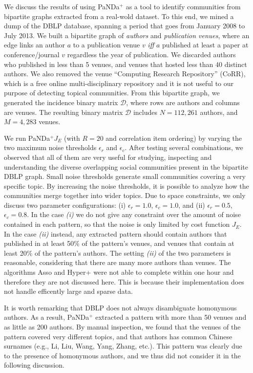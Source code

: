 \documentclass{article}
\newcommand{\db}      {\ensuremath{\mathcal{D}}\xspace}  %
\newcommand{\myalgostyle}[1]  {{\sc #1}\xspace}
\newcommand{\pandaplus}        {\myalgostyle{PaNDa$^+$}}
\newcommand{\hyperplus}    {\myalgostyle{Hyper+}}
\newcommand{\asso}           {\myalgostyle{Asso}}
\newcommand{\hide}[1]{}
\begin{document}
We discuss the results of using \pandaplus as a tool to identify communities from bipartite graphs extracted from a real-wold dataset.
To this end, we mined a dump of the DBLP database, 
spanning a period that goes from January 2008 to July 2013. 
We built a bipartite graph of \emph{authors} and \emph{publication venues}, where 
an edge links an author $a$ to a publication venue $v$ \emph{iff} $a$ published at 
least a paper at conference/journal $v$ regardless the year of publication.
We discarded authors who published in less than 5 venues, and 
venues that hosted less than 40 distinct authors. 
We also removed the venue ``Computing Research Repository'' (CoRR)\hide{\footnote{\url{http://arxiv.org/corr/home}}}, which is a free online multi-disciplinary repository
and it is not useful to our purpose of detecting topical communities.
From this bipartite graph, we generated the incidence binary matrix \db, where  rows are authors and columns are venues.
The resulting binary matrix $\db$ includes $N = 112,261$ authors, and $M = 4,283$ venues.

We run \pandaplus $J_E$ (with $R=20$ and correlation item ordering) by varying 
the two maximum noise thresholds $\epsilon_{r}$ and $\epsilon_{c}$.
After testing several combinations, we observed that all of them are very useful for studying, inspecting and understanding the
diverse overlapping social communities present in the bipartite DBLP graph. Small noise thresholds generate small communities covering a very specific topic.
By increasing the noise thresholds, it is possible to analyze how the communities merge together into wider topics.
Due to space constraints, we only discuss two parameter configurations: 
(i)  $\epsilon_{r}=1.0$, $\epsilon_{c}=1.0$,  and (ii)  $\epsilon_{r}=0.5$, $\epsilon_{c}=0.8$.
In the case \emph{(i)} we do not give any constraint over the amount of noise contained in each pattern, so that the noise is only limited by cost function $J_E$.
In the case \emph{(ii)} instead, any extracted pattern should contain authors that published in at least  50\% of the pattern's venues,
and venues that contain at least 20\% of the pattern's authors.
The setting \emph{(ii)} of the two parameters is reasonable, considering that  
there are many more authors than venues. 
The algorithms \asso and \hyperplus were not able to complete within one hour and therefore they are not discussed here.
This is because their implementation does not handle efficently large and sparse data.

It is worth remarking 
that DBLP does not always disambiguate homonymous authors.
As a result, \pandaplus extracted a pattern with more than 50  venues  and as little as 200 authors.
By manual inspection, we found that the venues of the pattern covered very different topics, and that authors has common Chinese surnames (e.g., Li, Liu, Wang, Yang, Zhang, etc.).
This pattern was clearly due to the presence of homonymous authors, and we thus did not consider it in the following discussion.
\end{document}
